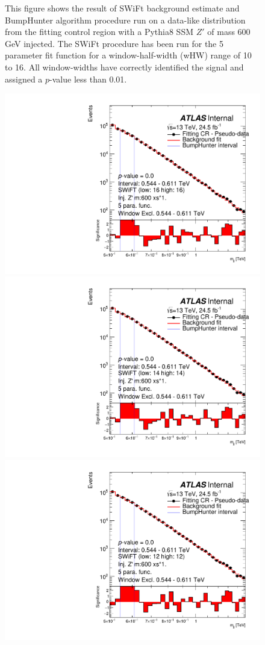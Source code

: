 \begin{figure}[!htb]
{}
\vspace{10pt}
\caption{\label{fig:app-bhFit_lm_corrFitCR_dataLike_inj_Zprimebb600_xsFactor1}
  This figure shows the result of SWiFt background estimate and {\sc BumpHunter} algorithm procedure run on a data-like distribution
  from the fitting control region with a Pythia8 SSM $Z'$ of mass 600 GeV injected.
  The SWiFt procedure has been run for the 5 parameter fit function for a window-half-width (wHW) range of 10 to 16.
  All window-widths have correctly identified the signal and assigned a $p$-value less than 0.01.
}
\end{figure}

\begin{figure}[!htb]
\captionsetup[subfigure]{aboveskip=0pt,justification=centering}
\centering
{} {
  \includegraphics[width=0.45\linewidth, angle=0]{figs/Dibjet/LowMass/FitStudy/bhFit_corrFitCR_dataLike_v13_5para_low16_high16_inj_Zprimebb600_xsFactor1_removedWindow.pdf}
}
 {
  \includegraphics[width=0.45\linewidth, angle=0]{figs/Dibjet/LowMass/FitStudy/bhFit_corrFitCR_dataLike_v13_5para_low14_high14_inj_Zprimebb600_xsFactor1_removedWindow.pdf}
}\\
 {
  \includegraphics[width=0.45\linewidth, angle=0]{figs/Dibjet/LowMass/FitStudy/bhFit_corrFitCR_dataLike_v13_5para_low12_high12_inj_Zprimebb600_xsFactor1_removedWindow.pdf}
}
\end{figure}
